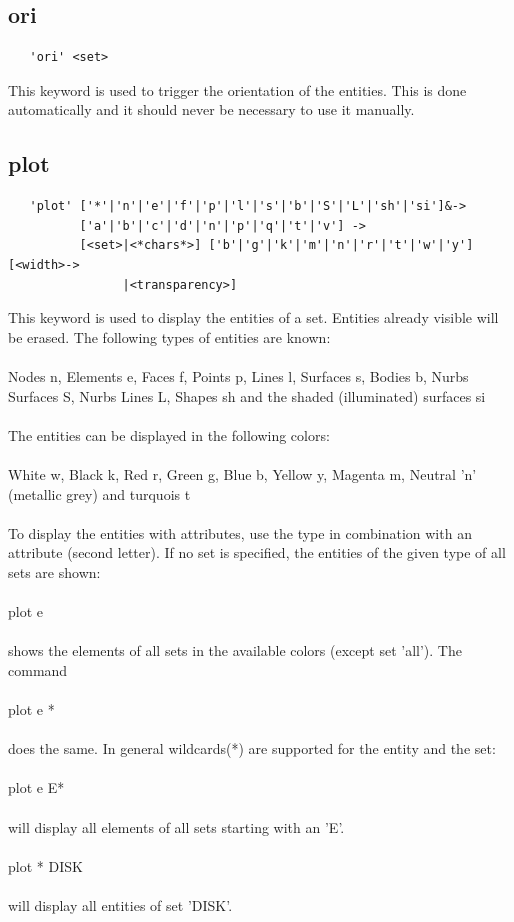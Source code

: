 \documentclass{article}
\begin{document}
\subsection{\label{ori}ori}
\begin{verbatim}
   'ori' <set> 
\end{verbatim}
This keyword is used to trigger the orientation of the entities. This is done automatically and it should never be necessary to use it manually.

\subsection{\label{plot}plot}
\begin{verbatim}
   'plot' ['*'|'n'|'e'|'f'|'p'|'l'|'s'|'b'|'S'|'L'|'sh'|'si']&->
          ['a'|'b'|'c'|'d'|'n'|'p'|'q'|'t'|'v'] ->
          [<set>|<*chars*>] ['b'|'g'|'k'|'m'|'n'|'r'|'t'|'w'|'y'] [<width>->
                |<transparency>] 
\end{verbatim}
This keyword is used to display the entities of a set. Entities already visible will be erased. The following types of entities are known:\\\\
Nodes n, Elements e, Faces f, Points p, Lines l, Surfaces s, Bodies b, Nurbs Surfaces S, Nurbs Lines L, Shapes sh and the shaded (illuminated) surfaces si\\\\The entities can be displayed in the following colors:\\\\
White w, Black k, Red r, Green g, Blue b, Yellow y, Magenta m, Neutral 'n' (metallic grey) and turquois t\\\\ To display the entities with attributes, use the type in combination with an attribute (second letter). If no set is specified, the entities of the given type of all sets are shown:\\\\plot e\\\\shows the elements of all sets in the available colors (except set 'all'). The command \\\\plot e *\\\\does the same. In general wildcards(*) are supported for the entity and the set:\\\\plot e E*\\\\will display all elements of all sets starting with an 'E'.\\\\plot * DISK\\\\will display all entities of set 'DISK'.
\end{document}
